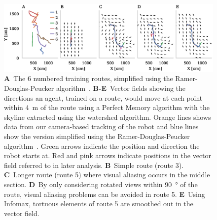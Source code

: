 \documentclass[letterpaper]{article}
\begin{document}
\begin{figure}[t]
    \centering
    \includegraphics{figures/vector_field.eps}
    \caption{
    \textbf{A}~The 6 numbered training routes, simplified using the Ramer-Douglas-Peucker algorithm~\citep{Ramer1972}.
    \textbf{B-E}~Vector fields showing the directions an agent, trained on a route, would move at each point within \SI{4}{\metre} of the route using a Perfect Memory algorithm with the skyline extracted using the watershed algorithm. 
    Orange lines shows data from our camera-based tracking of the robot and blue lines show the version simplified using the Ramer-Douglas-Peucker algorithm~\citep{Ramer1972}.
    Green arrows indicate the position and direction the robot starts at.
    Red and pink arrows indicate positions in the vector field referred to in later analysis.
    \textbf{B}~Simple route (route 3).
    \textbf{C}~Longer route (route 5) where visual aliasing occurs in the middle section.
    \textbf{D}~By only considering rotated views within \SI{90}{\degree} of the route, visual aliasing problems can be avoided in route 5.
    \textbf{E}~Using Infomax, tortuous elements of route 5 are smoothed out in the vector field.}
    \label{fig:vector_fields}
\end{figure}
\end{document}
